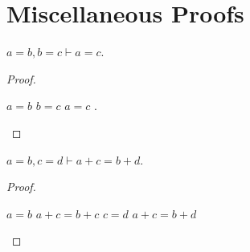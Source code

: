 \appendix

\section{Miscellaneous Proofs}
\label{sec:misc-proofs}

\begin{lemma}[\texttt{trn=}]
\label{thm:trn-eq}
$a = b, b = c \vdash a = c$.
\end{lemma}
\begin{proof}\leavevmode

\begin{formalproof}
\State \label{p:trn-eq:1a}$a = b$
\State \label{p:trn-eq:1b}$b = c$
\State \label{p:trn-eq:2}$a = c$
    .
\end{formalproof}

\end{proof}

\begin{lemma}[\texttt{add=}]
\label{thm:add-eq}
$a = b, c = d \vdash a + c = b + d$.
\end{lemma}
\begin{proof}\leavevmode

\begin{formalproof}
\State \label{p:add-eq:1a}$a = b$
\State \label{p:add-eq:2}$a + c = b + c$
\State \label{p:add-eq:1b}$c = d$
\State \label{p:add-eq:3}$a + c = b + d$
\end{formalproof}

\end{proof}

